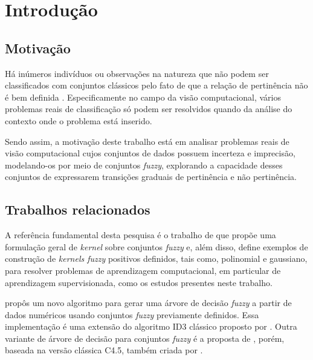 \chapter{Introdução}
\label{cap:introducao}


\section{Motivação}
\label{sec:consideracoes_preliminares}

Há inúmeros indivíduos ou observações na natureza que não podem ser classificados com conjuntos clássicos pelo fato de que a relação de pertinência não é bem definida \citep{pedrycz:98}. Especificamente no campo da visão computacional, vários problemas reais de classificação só podem ser resolvidos quando da análise do contexto onde o problema está inserido.

Sendo assim, a motivação deste trabalho está em analisar problemas reais de visão computacional cujos conjuntos de dados possuem incerteza e imprecisão, modelando-os por meio de conjuntos \emph{fuzzy}, explorando a capacidade desses conjuntos de expressarem transições graduais de pertinência e não pertinência.


\section{Trabalhos relacionados}
\label{sec:trabalhos_relacionados}

A referência fundamental desta pesquisa é o trabalho de \citet{guevara:14} que propõe uma formulação geral de \emph{kernel} sobre conjuntos \emph{fuzzy} e, além disso, define exemplos de construção de \emph{kernels fuzzy} positivos definidos, tais como, polinomial e gaussiano, para resolver problemas de aprendizagem computacional, em particular de aprendizagem supervisionada, como os estudos presentes neste trabalho.

\citet{umano:94} propôs um novo algoritmo para gerar uma árvore de decisão \emph{fuzzy} a partir de dados numéricos usando conjuntos \emph{fuzzy} previamente definidos. Essa implementação é uma extensão do algoritmo ID3 clássico proposto por \citet{quinlan:86}. Outra variante de árvore de decisão para conjuntos \emph{fuzzy} é a proposta de \citet{cintra:13}, porém, baseada na versão clássica C4.5, também criada por \citet{quinlan:93}.


